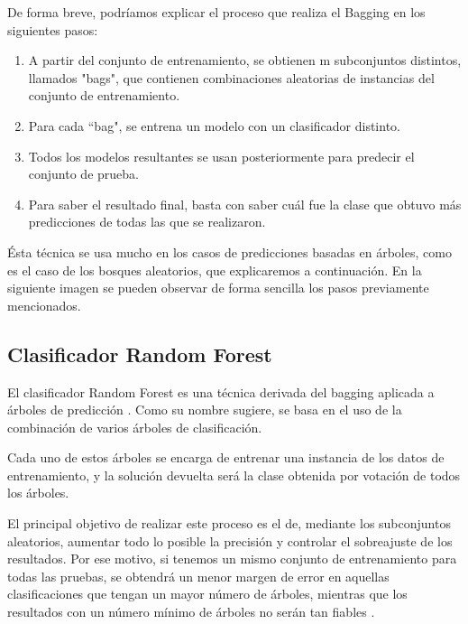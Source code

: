 De forma breve, podríamos explicar el proceso que realiza el Bagging en los siguientes pasos:

\begin{enumerate}

\item  A partir del conjunto de entrenamiento, se obtienen m subconjuntos distintos, llamados "bags", que contienen combinaciones aleatorias de instancias del conjunto de entrenamiento.

\item Para cada ``bag", se entrena un modelo con un clasificador distinto.

\item Todos los modelos resultantes se usan posteriormente para predecir el conjunto de prueba.

\item Para saber el resultado final, basta con saber cuál fue la clase que obtuvo más predicciones de todas las que se realizaron.

\end{enumerate}

Ésta técnica se usa mucho en los casos de predicciones basadas en árboles, como es el caso de los bosques aleatorios, que explicaremos a continuación. En la siguiente imagen se pueden observar de forma sencilla los pasos previamente mencionados.


\subsection{Clasificador Random Forest}

El clasificador Random Forest es una técnica derivada del bagging aplicada a árboles de predicción \cite{randomforestclassifier}. Como su nombre sugiere, se basa en el uso de la combinación de varios árboles de clasificación. 

Cada uno de estos árboles se encarga de entrenar una instancia de los datos de entrenamiento, y la solución devuelta será la clase obtenida por votación de todos los árboles. 

El principal objetivo de realizar este proceso es el de, mediante los subconjuntos aleatorios, aumentar todo lo posible la precisión y controlar el sobreajuste de los resultados. Por ese motivo, si tenemos un mismo conjunto de entrenamiento para todas las pruebas, se obtendrá un menor margen de error en aquellas clasificaciones que tengan un mayor número de árboles, mientras que los resultados con un número mínimo de árboles no serán tan fiables \cite{randomforestclassifierberkeley}.

